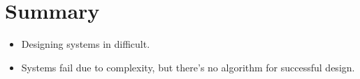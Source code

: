 \documentclass[psamsfonts]{amsart}
\begin{document}
\section{Summary}

\begin{itemize}
\item Designing systems in difficult.
\item Systems fail due to complexity, but there's no algorithm for successful design.
\end{itemize}
\end{document}
